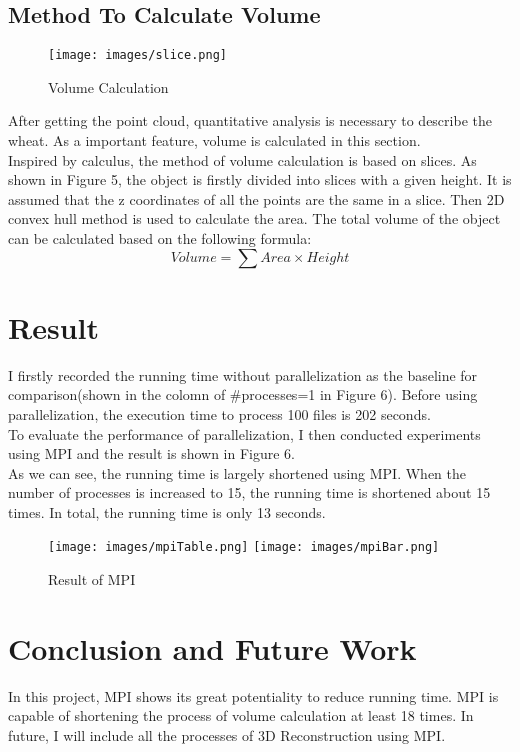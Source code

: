 \documentclass[a4paper]{article}
\begin{document}
\subsection{Method To Calculate Volume}

\begin{figure}[H]
    \centering
    \texttt{[image: images/slice.png]}
    \caption{Volume Calculation}
\end{figure}

After getting the point cloud, quantitative analysis is necessary to describe the wheat. As a important feature, volume is calculated in this section. \\
Inspired by calculus, the method of volume calculation is based on slices. As shown in Figure 5, the object is firstly divided into slices with a given height. It is assumed that the z coordinates of all the points are the same in a slice. Then 2D convex hull method is used to calculate the area. The total volume of the object can be calculated based on the following formula:
$$Volume=\sum Area \times Height$$

\section{Result}
I firstly recorded the running time without parallelization as the baseline for comparison(shown in the colomn of \#processes=1 in Figure 6). Before using parallelization, the execution time to process 100 files is 202 seconds.\\
To evaluate the performance of parallelization, I then conducted experiments using MPI and the result is shown in Figure 6.\\
As we can see, the running time is largely shortened using MPI. When the number of processes is increased to 15, the running time is shortened about 15 times. In total, the running time is only 13 seconds.\\

\begin{figure}[htbp]
   \centering
   \texttt{[image: images/mpiTable.png]}
   \texttt{[image: images/mpiBar.png]}
   \caption{Result of MPI}
\end{figure}

\section{Conclusion and Future Work}
In this project, MPI shows its great potentiality to reduce running time. MPI is capable of shortening the process of volume calculation at least 18 times. In future, I will include all the processes of 3D Reconstruction using MPI.
\end{document}
